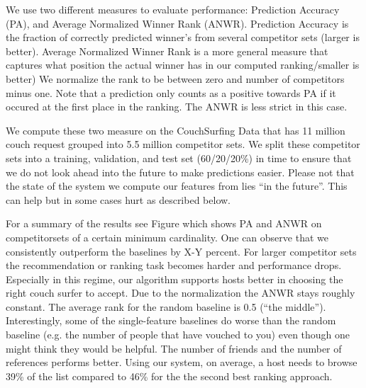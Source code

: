 We use two different measures to evaluate performance: Prediction Accuracy (PA), and Average Normalized Winner Rank (ANWR). Prediction Accuracy is the fraction of correctly predicted winner's from several competitor sets (larger is better). Average Normalized Winner Rank is a more general measure that captures what position the actual winner has in our computed ranking/smaller is better) We normalize the rank to be between zero and number of competitors minus one. Note that a prediction only counts as a positive towards PA if it occured at the first place in the ranking. The ANWR is less strict in this case. 

We compute these two measure on the CouchSurfing Data that has 11 million couch request grouped into 5.5 million competitor sets. We split these competitor sets into a training, validation, and test set (60/20/20\%) in time to ensure that we do not look ahead into the future to make predictions easier. Please not that the state of the system we compute our features from lies ``in the future''. This can help but in some cases hurt as described below.

For a summary of the results see Figure  which shows PA and ANWR on competitorsets of a certain minimum cardinality. One can observe that we consistently outperform the baselines by X-Y percent. For larger competitor sets the recommendation or ranking task becomes harder and performance drops. Especially in this regime, our algorithm supports hosts better in choosing the right couch surfer to accept. Due to the normalization the ANWR stays roughly constant. The average rank for the random baseline is 0.5 (``the middle''). Interestingly, some of the single-feature baselines do worse than the random baseline (e.g. the number of people that have vouched to you) even though one might think they would be helpful. The number of friends and the number of references performs better. Using our system, on average, a host needs to browse 39\% of the list compared to 46\% for the the second best ranking approach.

